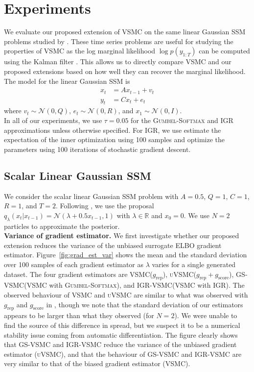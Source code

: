 \documentclass[12pt]{article}
\newcommand{\vsmc}{\textsc{VSMC}\xspace}
\newcommand{\uvsmc}{\textsc{uVSMC}\xspace}
\newcommand{\gsvsmc}{\textsc{GS-VSMC}\xspace}
\newcommand{\igrvsmc}{\textsc{IGR-VSMC}\xspace}
\newcommand{\elbo}{\textsc{ELBO}\xspace}
\newcommand{\grep}{g_{\mathrm{rep}}}
\newcommand{\gscore}{g_{\mathrm{score}}}
\newcommand{\gumbelsoftmax}{\textsc{Gumbel-Softmax}\xspace}
\newcommand{\igr}{\textsc{IGR}\xspace}
\newcommand{\ssm}{\textsc{SSM}\xspace}
\begin{document}
\section{Experiments}\label{sec:experiments}

We evaluate our proposed extension of \vsmc on the same linear Gaussian \ssm problems studied by \textcite{Naesseth:2018}. These time series problems are useful for studying the properties of \vsmc as the log marginal likelihood $\log p(y_{1:T})$ can be computed using the Kalman filter \parencite{Jong:1988}. This allows us to directly compare \vsmc and our proposed extensions based on how well they can recover the marginal likelihood. The model for the linear Gaussian \ssm is
\begin{align*}
x_t &= Ax_{t-1} + v_t \\
y_t &= Cx_t + e_t
\end{align*}
where $v_t\sim\mathcal{N}(0,Q)$, $e_t\sim\mathcal{N}(0,R)$, and $x_1\sim\mathcal{N}(0,I)$.
\\

In all of our experiments, we use $\tau=0.05$ for the \gumbelsoftmax and \igr approximations unless otherwise specified. For \igr, we use estimate the expectation of the inner optimization using 100 samples and optimize the parameters using 100 iterations of stochastic gradient descent.

\subsection{Scalar Linear Gaussian \ssm}

We consider the scalar linear Gaussian \ssm problem with $A=0.5$, $Q=1$, $C=1$, $R=1$, and $T=2$. Following \textcite{Naesseth:2018}, we use the proposal $q_\lambda(x_t|x_{t-1}) = \mathcal{N}(\lambda+0.5x_{t-1}, 1)$ with $\lambda\in\mathbb{R}$ and $x_0=0$. We use $N=2$ particles to approximate the posterior.
\\

\textbf{Variance of gradient estimator.} We first investigate whether our proposed extension reduces the variance of the unbiased surrogate \elbo gradient estimator. Figure~\ref{fig:grad_est_var} shows the mean and the standard deviation over 100 samples of each gradient estimator as $\lambda$ varies for a single generated dataset. The four gradient estimators are \vsmc ($\grep$), \uvsmc ($\grep+\gscore$), \gsvsmc (\vsmc with \gumbelsoftmax), and \igrvsmc (\vsmc with \igr). The observed behaviour of \vsmc and \uvsmc are similar to what was observed with $\grep$ and $\gscore$ in \parencite{Naesseth:2018}, though we note that the standard deviation of our estimators appears to be larger than what they observed (for $N=2$). We were unable to find the source of this difference in spread, but we suspect it to be a numerical stability issue coming from automatic differentiation. The figure clearly shows that \gsvsmc and \igrvsmc reduce the variance of the unbiased gradient estimator (\uvsmc), and that the behaviour of \gsvsmc and \igrvsmc are very similar to that of the biased gradient estimator (\vsmc).
\\
\end{document}
